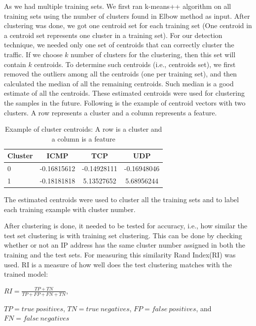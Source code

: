 \documentclass[12pt,oneside,a4paper]{article}
\begin{document}
As we had multiple training sets. We first ran k-means++ algorithm on all training sets using the number of clusters found in Elbow method as input. After clustering was done, we got one centroid set for each training set (One centroid in a centroid set represents one cluster in a training set). For our detection technique, we needed only one set of centroids that can correctly cluster the traffic. If we choose $k$ number of clusters for the clustering, then this set will contain $k$ centroids. To determine such centroids (i.e., centroids set), we first removed the outliers among all the centroids (one per training set), and then calculated the median of all the remaining centroids. Such median is a good estimate of all the centroids. These estimated centroids were used for clustering the samples in the future. Following is the example of centroid vectors with two clusters. A row represents a cluster and a column represents a feature.

\begin{table}[H]
\centering
  \begin{tabular}{ l | c  c  c }
    Cluster      & ICMP  & TCP  & UDP \\
    \hline
    0         &{-0.16815612}       &{-0.14928111}    &{-0.16948046} \\
    1         &{-0.18181818}       &{5.13527652}     &{5.68956244} \\
  \end{tabular}
\caption{Example of cluster centroids: A row is a cluster and a column is a feature} \label{table:centroids-example}
\end{table}

The estimated centroids were used to cluster all the training sets and to label each training example with cluster number.

After clustering is done, it needed to be tested for accuracy, i.e., how similar the test set clustering is with training set clustering. This can be done by checking whether or not an IP address has the same cluster number assigned in both the training and the test sets. For measuring this similarity Rand Index(RI)\cite{ri-index} was used. RI is a measure of how well does the test clustering matches with the trained model:

\hspace{4cm} $RI={\frac {TP+TN}{TP+FP+FN+TN}}$,

$TP= true\ positives$, $TN=true\ negatives$, $FP= false\ positives$, and $FN= false\ negatives$
\end{document}
